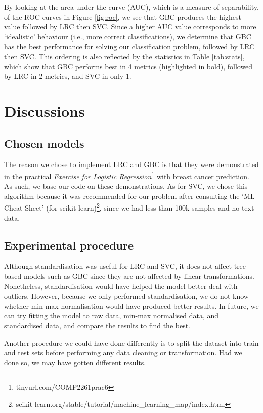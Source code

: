 \documentclass[twoside,11pt]{article}
\begin{document}
By looking at the area under the curve (AUC), which is a measure of separability, of the ROC curves in Figure \ref{fig:roc}, we see that GBC produces the highest value followed by LRC then SVC. Since a higher AUC value corresponds to more `idealistic' behaviour (i.e., more correct classifications), we determine that GBC has the best performance for solving our classification problem, followed by LRC then SVC. This ordering is also reflected by the statistics in Table \ref{tab:stats}, which show that GBC performs best in 4 metrics (highlighted in bold), followed by LRC in 2 metrics, and SVC in only 1. 

\section{Discussions}
\subsection{Chosen models}
The reason we chose to implement LRC and GBC is that they were demonstrated in the practical \emph{Exercise for Logistic Regression}\footnote{tinyurl.com/COMP2261prac6} with breast cancer prediction. As such, we base our code on these demonstrations. As for SVC, we chose this algorithm because it was recommended for our problem after consulting the `ML Cheat Sheet' (for scikit-learn)\footnote{scikit-learn.org/stable/tutorial/machine\_learning\_map/index.html}, since we had less than 100k samples and no text data.

\subsection{Experimental procedure}
Although standardisation was useful for LRC and SVC, it does not affect tree based models such as GBC since they are not affected by linear transformations. Nonetheless, standardisation would have helped the model better deal with outliers. However, because we only performed standardisation, we do not know whether min-max normalisation would have produced better results. In future, we can try fitting the model to raw data, min-max normalised data, and standardised data, and compare the results to find the best. 

Another procedure we could have done differently is to split the dataset into train and test sets before performing any data cleaning or transformation. Had we done so, we may have gotten different results. 
\end{document}
